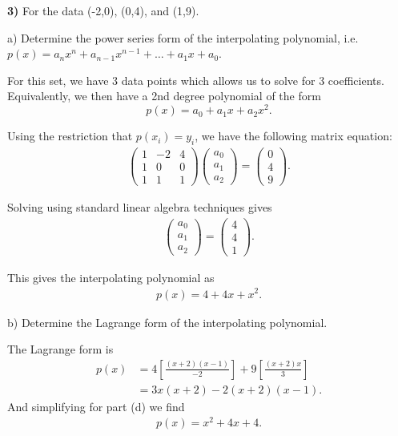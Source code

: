 \documentclass[12pt,a4paper]{article}
\newcommand{\prob}[2]{\textbf{#1)} #2}
\begin{document}
\prob{3}{For the data (-2,0), (0,4), and (1,9).}

a) Determine the power series form of the interpolating polynomial, i.e. $p(x) = a_{n}x^{n} + a_{n-1}x^{n-1} + \ldots + a_1x + a_0$.

For this set, we have 3 data points which allows us to solve for 3 coefficients. Equivalently, we then have a 2nd degree polynomial of the form
\[
p\left( x \right) = a_0 + a_1 x + a_2 x^2
.\]

Using the restriction that $p\left( x_{i} \right) = y_{i}$, we have the following matrix equation:
\begin{align*}
    \begin{pmatrix}
        1 & -2 & 4 \\
        1 &  0 & 0 \\
        1 &  1 &  1
    \end{pmatrix} 
    \begin{pmatrix}
    a_0 \\ 
    a_1 \\
    a_2
    \end{pmatrix}
    =
    \begin{pmatrix}
    0 \\
    4 \\
    9
    \end{pmatrix} 
.\end{align*}

Solving using standard linear algebra techniques gives
\begin{align*}
    \begin{pmatrix}
    a_0 \\
    a_1 \\
    a_2
    \end{pmatrix}
    =
   \begin{pmatrix}
   4 \\
   4 \\
   1
   \end{pmatrix}  
.\end{align*}

This gives the interpolating polynomial as
\begin{align*}
    p(x) = 4 + 4x + x^2
.\end{align*}

b) Determine the Lagrange form of the interpolating polynomial.

The Lagrange form is 
\begin{align*}
    p(x) &= 4\left[ \frac{\left( x+2 \right)\left( x-1 \right)}{-2} \right] + 9\left[ \frac{\left( x+2 \right)x}{3} \right] \\
    &= 3x\left( x+2 \right) -2\left( x+2 \right)\left( x-1 \right)
.\end{align*}
And simplifying for part (d) we find
\begin{align*}
   p\left( x \right) = x^2 + 4x + 4 
.\end{align*}
\end{document}
